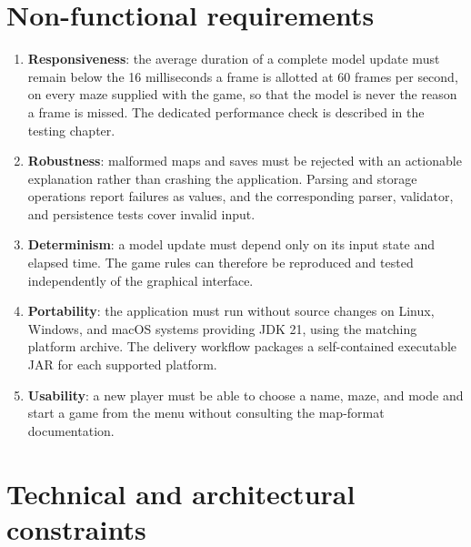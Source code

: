 \section{Non-functional requirements}

\begin{enumerate}[label=\textbf{NFR-\arabic*}]
  \item \textbf{Responsiveness}: the average duration of a complete model update must remain below the 16 milliseconds a
  frame is allotted at 60 frames per second, on every maze supplied with the game, so that the model is never the reason
  a frame is missed. The dedicated performance check is described in the testing chapter.
  \item \textbf{Robustness}: malformed maps and saves must be rejected with an actionable explanation rather than crashing the
  application. Parsing and storage operations report failures as values, and the corresponding parser,
  validator, and persistence tests cover invalid input.
  \item \textbf{Determinism}: a model update must depend only on its input state and elapsed time. The game rules can therefore
  be reproduced and tested independently of the graphical interface.
  \item \textbf{Portability}: the application must run without source changes on Linux, Windows, and macOS systems
  providing JDK 21, using the matching platform archive. The delivery workflow packages a self-contained executable JAR
  for each supported platform.
  \item \textbf{Usability}: a new player must be able to choose a name, maze, and mode and start a game from the menu without
  consulting the map-format documentation.
\end{enumerate}

\section{Technical and architectural constraints}

